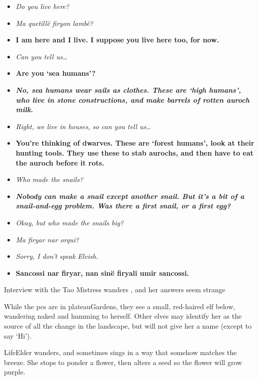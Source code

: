 \begin{multicols}{2}
\begin{itemize}
  \item\it
  Do you live here?
  \item[\adforn{51}]\sl
  Ma quetill\"e firyon lamb\"e?
  \item[\adforn{53}]\bf
  I am here and I live.
  I suppose you live here too, for now.
  \item\it
  Can you tell us\ldots
  \item[\adforn{53}]\bf
  Are you `sea humans'?
  \item[\adforn{52}]\bf\sl
  No, sea humans wear sails as clothes. 
  These are `high humans', who live in stone constructions, and make barrels of rotten auroch milk.
  \item\it
  Right, we live in houses, so can you tell us\ldots
  \item[\adforn{53}]\bf
  You're thinking of dwarves.
  These are `forest humans', look at their hunting tools.
  They use these to stab aurochs, and then have to eat the auroch before it rots.
  \item\it
  Who made the snails?
  \item[\adforn{52}]\bf\sl
  Nobody can make a snail except another snail.
  But it's a bit of a snail-and-egg problem.
  Was there a first snail, or a first egg?
  \item\it
  Okay, but who made the snails \emph{big}?
  \item[\adforn{51}]\sl
  Ma firyar nar orqui?
  \item\it
  Sorry, I don't speak Elvish.
  \item[\adforn{53}]\bf
  Sancossi nar firyar, nan sin\"e firyali umir sancossi.
\end{itemize}



\showStdSpells

{Interview with the Tao Mistress}%
{ wanders , and her answers seem strange}%

While the \glspl{pc} are in \gls{plateauGardens}, they see a small, red-haired elf below, wandering naked and humming to herself.
Other elves may identify her as the source of all the change in the landscape, but will not give her a name (except to say `Hi').

\Gls{LifeElder} wanders, and sometimes sings in a way that somehow matches the breeze.
She stops to ponder a flower, then alters a seed so the flower will grow purple.


\end{multicols}
